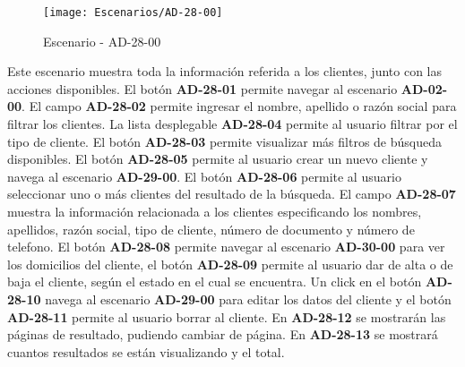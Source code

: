 \begin{figure}[H]
\centering
\texttt{[image: Escenarios/AD-28-00]}
\caption{Escenario - AD-28-00}
\label{fig:AD-28-00}
\end{figure}
Este escenario muestra toda la información referida a los clientes, junto con las acciones disponibles.
El botón \textbf{AD-28-01} permite navegar al escenario \textbf{AD-02-00}. El campo \textbf{AD-28-02} permite ingresar el nombre, apellido o razón social para filtrar los clientes. La lista desplegable \textbf{AD-28-04} permite al usuario filtrar por el tipo de cliente. El botón \textbf{AD-28-03} permite visualizar más filtros de búsqueda disponibles.
El botón \textbf{AD-28-05} permite al usuario crear un nuevo cliente y navega al escenario \textbf{AD-29-00}.
El botón \textbf{AD-28-06} permite al usuario seleccionar uno o más clientes del resultado de la búsqueda. El campo \textbf{AD-28-07} muestra la información relacionada a los clientes  especificando los nombres, apellidos, razón social, tipo de cliente, número de documento y número de telefono. El botón \textbf{AD-28-08} permite navegar al escenario \textbf{AD-30-00} para ver los domicilios del cliente, el botón \textbf{AD-28-09} permite al usuario dar de alta o de baja el cliente, según el estado en el cual se encuentra. Un click en el botón \textbf{AD-28-10} navega al escenario \textbf{AD-29-00} para editar los datos del cliente y el botón \textbf{AD-28-11} permite al usuario borrar al cliente.
En  \textbf{AD-28-12} se mostrarán las páginas de resultado, pudiendo cambiar de página. En \textbf{AD-28-13} se mostrará cuantos resultados se están visualizando y el total.
\clearpage
